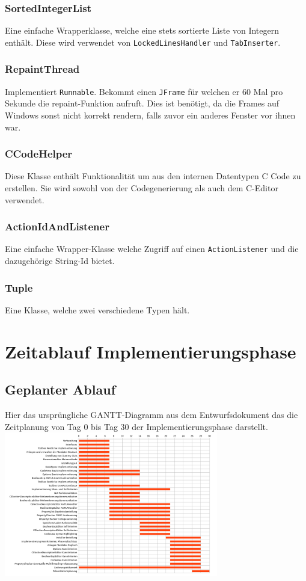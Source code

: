 \documentclass[a4paper]{scrreprt}
\begin{document}
\subsection{SortedIntegerList}
Eine einfache Wrapperklasse, welche eine stets sortierte Liste von Integern enthält. Diese wird verwendet von \verb!LockedLinesHandler! und \verb!TabInserter!.\\
\subsection{RepaintThread}
Implementiert \verb!Runnable!. Bekommt einen \verb!JFrame! für welchen er 60 Mal pro Sekunde die repaint-Funktion aufruft. Dies ist benötigt, da die Frames auf Windows sonst nicht korrekt rendern, falls zuvor ein anderes Fenster vor ihnen war.\\
\subsection{CCodeHelper}
Diese Klasse enthält Funktionalität um aus den internen Datentypen C Code zu erstellen. Sie wird sowohl von der Codegenerierung als auch dem C-Editor verwendet. \\
\subsection{ActionIdAndListener}
Eine einfache Wrapper-Klasse welche Zugriff auf einen \verb!ActionListener! und die dazugehörige String-Id bietet.\\
\subsection{Tuple}
Eine Klasse, welche zwei verschiedene Typen hält.

\chapter{Zeitablauf Implementierungsphase}

\section{Geplanter Ablauf}
Hier das ursprüngliche GANTT-Diagramm aus dem Entwurfsdokument das die Zeitplanung von Tag 0 bis Tag 30 der Implementierungsphase darstellt.\\
\includegraphics[angle=270,width=0.7\textwidth] {originalPlanung.png}
\end{document}
